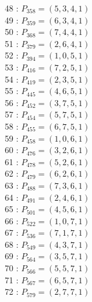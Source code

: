 \documentclass{article}
\begin{document}
{\begin{multicols}{3}
48 : $P_{358}=( 5, 3, 4, 1 )$\\
49 : $P_{359}=( 6, 3, 4, 1 )$\\
50 : $P_{368}=( 7, 4, 4, 1 )$\\
51 : $P_{379}=( 2, 6, 4, 1 )$\\
52 : $P_{394}=( 1, 0, 5, 1 )$\\
53 : $P_{416}=( 7, 2, 5, 1 )$\\
54 : $P_{419}=( 2, 3, 5, 1 )$\\
55 : $P_{445}=( 4, 6, 5, 1 )$\\
56 : $P_{452}=( 3, 7, 5, 1 )$\\
57 : $P_{454}=( 5, 7, 5, 1 )$\\
58 : $P_{455}=( 6, 7, 5, 1 )$\\
59 : $P_{458}=( 1, 0, 6, 1 )$\\
60 : $P_{476}=( 3, 2, 6, 1 )$\\
61 : $P_{478}=( 5, 2, 6, 1 )$\\
62 : $P_{479}=( 6, 2, 6, 1 )$\\
63 : $P_{488}=( 7, 3, 6, 1 )$\\
64 : $P_{491}=( 2, 4, 6, 1 )$\\
65 : $P_{501}=( 4, 5, 6, 1 )$\\
66 : $P_{522}=( 1, 0, 7, 1 )$\\
67 : $P_{536}=( 7, 1, 7, 1 )$\\
68 : $P_{549}=( 4, 3, 7, 1 )$\\
69 : $P_{564}=( 3, 5, 7, 1 )$\\
70 : $P_{566}=( 5, 5, 7, 1 )$\\
71 : $P_{567}=( 6, 5, 7, 1 )$\\
72 : $P_{579}=( 2, 7, 7, 1 )$\\
\end{multicols}


%


%


}%
\end{document}
